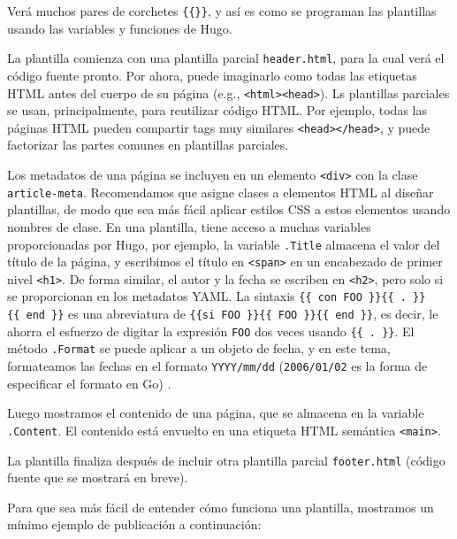 \documentclass[12pt,]{krantz}
\theoremstyle{definition}
\theoremstyle{definition}
\theoremstyle{definition}
\theoremstyle{remark}
\begin{document}
\begin{itemize}
\begin{itemize}
    Verá muchos pares de corchetes \texttt{\{\{\}\}}, y así es como se
    programan las plantillas usando las variables y funciones de Hugo.

    La plantilla comienza con una plantilla parcial
    \texttt{header.html}, para la cual verá el código fuente pronto. Por
    ahora, puede imaginarlo como todas las etiquetas HTML antes del
    cuerpo de su página (e.g.,
    \texttt{\textless{}html\textgreater{}\textless{}head\textgreater{}}).
    Ls plantillas parciales se usan, principalmente,
    para reutilizar código HTML. Por ejemplo, todas las páginas HTML
    pueden compartir tags muy similares
    \texttt{\textless{}head\textgreater{}\textless{}/head\textgreater{}},
    y puede factorizar las partes comunes en plantillas parciales.

    Los metadatos de una página se incluyen en un elemento
    \texttt{\textless{}div\textgreater{}} con la clase
    \texttt{article-meta}. Recomendamos que asigne clases a elementos
    HTML al diseñar plantillas, de modo que sea más fácil aplicar
    estilos CSS a estos elementos usando nombres de clase. En una
    plantilla, tiene acceso a muchas variables proporcionadas por Hugo,
    por ejemplo, la variable \texttt{.Title} almacena el valor del
    título de la página, y escribimos el título en
    \texttt{\textless{}span\textgreater{}} en un encabezado de primer
    nivel \texttt{\textless{}h1\textgreater{}}. De forma similar, el
    autor y la fecha se escriben en
    \texttt{\textless{}h2\textgreater{}}, pero solo si se proporcionan
    en los metadatos YAML. La sintaxis
    \texttt{\{\{\ con\ FOO\ \}\}\{\{\ .\ \}\}\{\{\ end\ \}\}} es una
    abreviatura de
    \texttt{\{\{si\ FOO\ \}\}\{\{\ FOO\ \}\}\{\{\ end\ \}\}}, es decir,
    le ahorra el esfuerzo de digitar la expresión \texttt{FOO} dos veces
    usando \texttt{\{\{\ .\ \}\}}. El método \texttt{.Format} se puede
    aplicar a un objeto de fecha, y en este tema, formateamos las fechas
    en el formato \texttt{YYYY/mm/dd} (\texttt{2006/01/02} es la forma
    de especificar el formato en Go) .

    Luego mostramos el contenido de una página, que se almacena en la
    variable \texttt{.Content}. El contenido está envuelto en una
    etiqueta HTML semántica \texttt{\textless{}main\textgreater{}}.

    La plantilla finaliza después de incluir otra plantilla parcial
    \texttt{footer.html} (código fuente que se mostrará en breve).

    Para que sea más fácil de entender cómo funciona una plantilla,
    mostramos un mínimo ejemplo de publicación a continuación:


\end{itemize}
\end{itemize}
\end{document}
